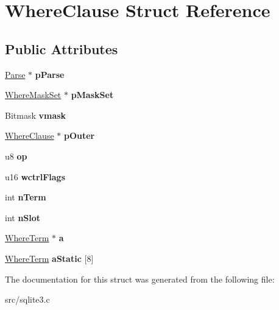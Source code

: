 \hypertarget{struct_where_clause}{\section{Where\-Clause Struct Reference}
\label{struct_where_clause}
}
\subsection*{Public Attributes}
\begin{DoxyCompactItemize}
\item 
\hypertarget{struct_where_clause_a3ff6dfc93e7b9b97a9bf9a0618a1d542}{\hyperlink{struct_parse}{Parse} $\ast$ {\bfseries p\-Parse}}\label{struct_where_clause_a3ff6dfc93e7b9b97a9bf9a0618a1d542}

\item 
\hypertarget{struct_where_clause_ae308a1600721b7dfa0855136926a5554}{\hyperlink{struct_where_mask_set}{Where\-Mask\-Set} $\ast$ {\bfseries p\-Mask\-Set}}\label{struct_where_clause_ae308a1600721b7dfa0855136926a5554}

\item 
\hypertarget{struct_where_clause_aaef3dd42bb6c23890d8ad8824e2a00ee}{Bitmask {\bfseries vmask}}\label{struct_where_clause_aaef3dd42bb6c23890d8ad8824e2a00ee}

\item 
\hypertarget{struct_where_clause_a6f72d61f416a323f39a8d3e2be62f607}{\hyperlink{struct_where_clause}{Where\-Clause} $\ast$ {\bfseries p\-Outer}}\label{struct_where_clause_a6f72d61f416a323f39a8d3e2be62f607}

\item 
\hypertarget{struct_where_clause_a7a56a5fe1ab6603e930f3b5372ff2f71}{u8 {\bfseries op}}\label{struct_where_clause_a7a56a5fe1ab6603e930f3b5372ff2f71}

\item 
\hypertarget{struct_where_clause_a65f8d6f982be80ca3336483ddb8a2f3e}{u16 {\bfseries wctrl\-Flags}}\label{struct_where_clause_a65f8d6f982be80ca3336483ddb8a2f3e}

\item 
\hypertarget{struct_where_clause_ab84924c3c78af1ab387ab3919c5031c4}{int {\bfseries n\-Term}}\label{struct_where_clause_ab84924c3c78af1ab387ab3919c5031c4}

\item 
\hypertarget{struct_where_clause_ac92b93d65d4c3d9216707a049a4edb1c}{int {\bfseries n\-Slot}}\label{struct_where_clause_ac92b93d65d4c3d9216707a049a4edb1c}

\item 
\hypertarget{struct_where_clause_a140d726a3e20ac7b6853d539c59add72}{\hyperlink{struct_where_term}{Where\-Term} $\ast$ {\bfseries a}}\label{struct_where_clause_a140d726a3e20ac7b6853d539c59add72}

\item 
\hypertarget{struct_where_clause_a4acb8640bc9f42752900de5735bcd8e0}{\hyperlink{struct_where_term}{Where\-Term} {\bfseries a\-Static} \mbox{[}8\mbox{]}}\label{struct_where_clause_a4acb8640bc9f42752900de5735bcd8e0}

\end{DoxyCompactItemize}


The documentation for this struct was generated from the following file\-:\begin{DoxyCompactItemize}
\item 
src/sqlite3.\-c\end{DoxyCompactItemize}
